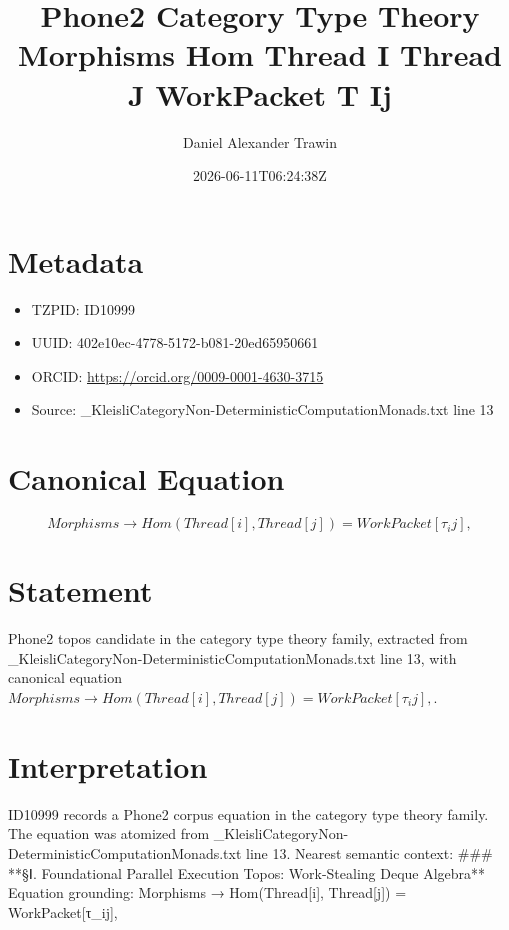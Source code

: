 \documentclass[11pt]{article}
\title{Phone2 Category Type Theory Morphisms Hom Thread I Thread J WorkPacket Τ Ij}
\author{Daniel Alexander Trawin}
\date{2026-06-11T06:24:38Z}
\begin{document}
\maketitle
\section*{Metadata}
\begin{itemize}
\item TZPID: ID10999
\item UUID: 402e10ec-4778-5172-b081-20ed65950661
\item ORCID: \url{https://orcid.org/0009-0001-4630-3715}
\item Source: _KleisliCategoryNon-DeterministicComputationMonads.txt line 13
\end{itemize}
\section*{Canonical Equation}
\[
Morphisms → Hom(Thread[i], Thread[j]) = WorkPacket[τ_ij],
\]
\section*{Statement}
Phone2 topos candidate in the category type theory family, extracted from _KleisliCategoryNon-DeterministicComputationMonads.txt line 13, with canonical equation $Morphisms → Hom(Thread[i], Thread[j]) = WorkPacket[τ_ij],$.
\section*{Interpretation}
ID10999 records a Phone2 corpus equation in the category type theory family. The equation was atomized from _KleisliCategoryNon-DeterministicComputationMonads.txt line 13. Nearest semantic context: ### **§Ⅰ. Foundational Parallel Execution Topos: Work-Stealing Deque Algebra** Equation grounding: Morphisms → Hom(Thread[i], Thread[j]) = WorkPacket[τ_ij],
\end{document}
